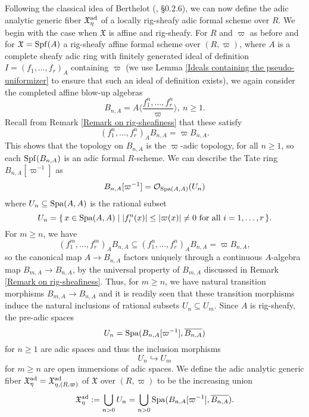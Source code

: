 \documentclass[12pt,twoside,a4paper]{article}
\theoremstyle{definition}
\theoremstyle{remark}
\newcommand\ad{{\rm ad}}
\newcommand\Spa{{\rm Spa}}
\newcommand\Spf{{\rm Spf}}
\begin{document}
Following the classical idea of Berthelot (\cite{Berthelot96}, \S0.2.6), we can now define the adic analytic generic fiber $\mathfrak{X}_{\eta}^{\ad}$ of a locally rig-sheafy adic formal scheme over $R$. We begin with the case when $\mathfrak{X}$ is affine and rig-sheafy. For $R$ and $\varpi$ as before and for $\mathfrak{X}=\Spf(A)$ a rig-sheafy affine formal scheme over $(R, \varpi)$, where $A$ is a complete sheafy adic ring with finitely generated ideal of definition $I=(f_1,\dots, f_r)_{A}$ containing $\varpi$ (we use Lemma \ref{Ideals containing the pseudo-uniformizer} to ensure that such an ideal of definition exists), we again consider the completed affine blow-up algebras\begin{equation*}B_{n,A}=A\langle \frac{f_{1}^{n},\dots, f_{r}^{n}}{\varpi}\rangle, \ n\geq 1.\end{equation*}Recall from Remark \ref{Remark on rig-sheafiness} that these satisfy \begin{equation*}(f_1^{n},\dots,f_r^{n})_{A}B_{n,A}=\varpi B_{n,A}.\end{equation*}This shows that the topology on $B_{n,A}$ is the $\varpi$-adic topology, for all $n\geq1$, so each $\Spf(B_{n,A})$ is an adic formal $R$-scheme. We can describe the Tate ring $B_{n,A}[\varpi^{-1}]$ as \begin{equation*}B_{n,A}[\varpi^{-1}]=\mathcal{O}_{\Spa(A, A)}(U_{n})\end{equation*}where $U_{n}\subseteq \Spa(A, A)$ is the rational subset \begin{equation*}U_{n}=\{\, x\in \Spa(A, A) \mid \vert f_{i}^{n}(x)\vert\leq \vert\varpi(x)\vert\neq 0 \ \text{for all}\ i=1,\dots, r\,\}.\end{equation*}For $m\geq n$, we have \begin{equation*}(f_1^{m},\dots, f_r^{m})_{A}B_{n,A}\subseteq (f_1^{n},\dots, f_r^{n})_{A}B_{n,A}=\varpi B_{n,A},\end{equation*}so the canonical map $A\to B_{n,A}$ factors uniquely through a continuous $A$-algebra map $B_{m,A}\to B_{n,A}$, by the universal property of $B_{m,A}$ discussed in Remark \ref{Remark on rig-sheafiness}. Thus, for $m\geq n$, we have natural transition morphisms $B_{m,A}\to B_{n,A}$ and it is readily seen that these transition morphisms induce the natural inclusions of rational subsets $U_{n}\subseteq U_{m}$. Since $A$ is rig-sheafy, the pre-adic spaces \begin{equation*}U_{n}=\Spa(B_{n,A}[\varpi^{-1}], \overline{B_{n,A}})\end{equation*}for $n\geq1$ are adic spaces and thus the inclusion morphisms\begin{equation*}U_{n}\hookrightarrow U_{m}\end{equation*}for $m\geq n$ are open immersions of adic spaces. We define the adic analytic generic fiber $\mathfrak{X}_{\eta}^{\ad}=\mathfrak{X}_{\eta, (R, \varpi)}^{\ad}$ of $\mathfrak{X}$ over $(R, \varpi)$ to be the increasing union \begin{equation*}\mathfrak{X}_{\eta}^{\ad}:=\bigcup_{n>0}U_{n}=\bigcup_{n>0}\Spa(B_{n,A}[\varpi^{-1}], \overline{B_{n,A}}).\end{equation*}
\end{document}
